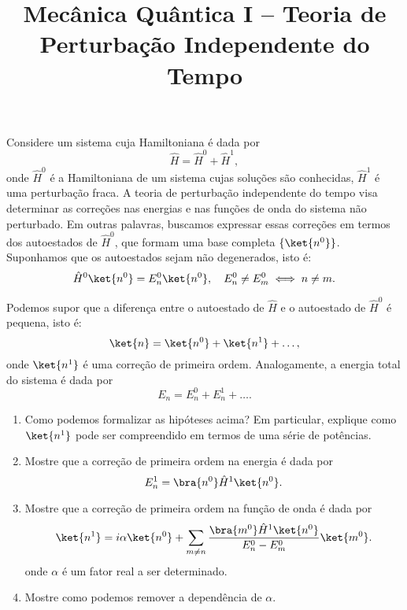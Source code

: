 \newif\ifuseseminar
\useseminartrue


\title{Mecânica Quântica I -- Teoria de Perturbação Independente do Tempo}	



Considere um sistema cuja Hamiltoniana é dada por
\begin{equation*}
      \hat{H} = \hat{H}^0 + \hat{H}^1,
\end{equation*}
onde $\hat{H}^0$ é a Hamiltoniana de um sistema cujas soluções são conhecidas,
$\hat{H}^1$ é uma perturbação fraca. A teoria de
perturbação independente do tempo visa determinar as correções nas energias e nas
funções de onda do sistema não perturbado. Em outras palavras, buscamos expressar essas
correções em termos dos autoestados de $\hat{H}^0$, que formam uma base completa
$\{\ket{n^0}\}$. Suponhamos que os autoestados sejam não degenerados, isto é:
\begin{equation*}
      \hat{H}^0\ket{n^0} = E_n^0\ket{n^0},\quad E^0_n \neq E^0_m \iff n \neq m.
\end{equation*}

Podemos supor que a diferença entre o autoestado de $\hat{H}$ e o autoestado
de $\hat{H}^0$ é pequena, isto é:
\begin{equation*}
      \ket{n} = \ket{n^0} + \ket{n^1} + \dots,
\end{equation*}
onde $\ket{n^1}$ é uma correção de primeira ordem. Analogamente, a energia
total do sistema é dada por
\begin{equation*}
      E_n = E_n^0 + E_n^1 + \dots.
\end{equation*}
\begin{enumerate}
      \item Como podemos formalizar as hipóteses acima? Em particular,
            explique como $\ket{n^1}$ pode ser compreendido em
            termos de uma série de potências.
      \item Mostre que a correção de primeira ordem na energia é dada por
            \begin{equation*}
                  E_n^1 = \bra{n^0}\hat{H}^1\ket{n^0}.
            \end{equation*}
      \item Mostre que a correção de primeira ordem na função de onda é dada por
            \begin{equation*}
                  \ket{n^1} = i\alpha\ket{n^0} + \sum_{m\neq n}\frac{\bra{m^0}\hat{H}^1\ket{n^0}}{E_n^0 - E_m^0}\ket{m^0}.
            \end{equation*}
            onde $\alpha$ é um fator real a ser determinado.
      \item Mostre como podemos remover a dependência de $\alpha$.
\end{enumerate}

